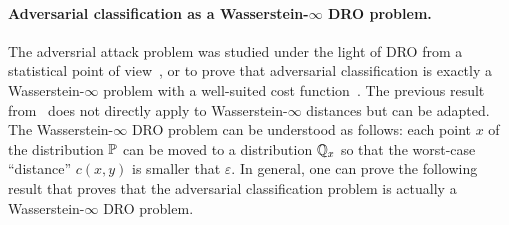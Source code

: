 \paragraph{Adversarial classification as a Wasserstein-$\infty$ DRO problem.} The adversrial attack problem was studied under the light of DRO from a statistical point of view~\citep{xxx}, or to prove that adversarial classification is exactly a Wasserstein-$\infty$ problem with a well-suited cost function~\citep{xxx}. The previous result from~\citep{blanchet2019quantifying} does not directly apply to Wasserstein-$\infty$ distances but can be adapted. The Wasserstein-$\infty$ DRO problem can be understood as follows: each point $x$ of the distribution $\mathbb{P}$ can be moved to a distribution $\mathbb{Q}_x$ so that the worst-case ``distance'' $c(x,y)$ is smaller that $\varepsilon$. In general, one can prove the following result that proves that the adversarial classification problem is actually a Wasserstein-$\infty$ DRO problem.

